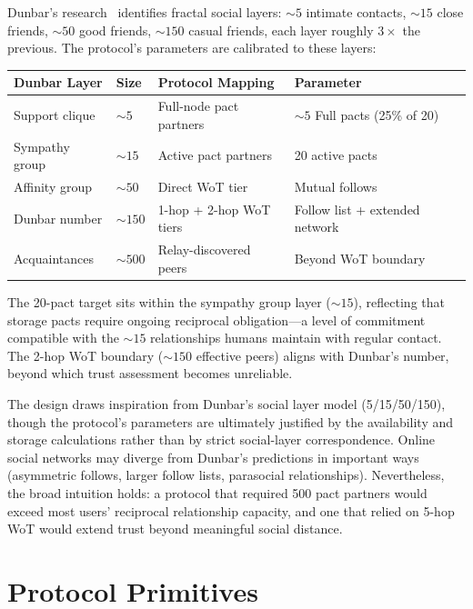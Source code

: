 \documentclass[11pt,a4paper]{article}
\begin{document}
Dunbar's research~\cite{dunbar} identifies fractal social layers: ${\sim}5$ intimate contacts, ${\sim}15$ close friends, ${\sim}50$ good friends, ${\sim}150$ casual friends, each layer roughly $3\times$ the previous. The protocol's parameters are calibrated to these layers:

\begin{table}[h]
\centering
\small
\begin{tabular}{lllll}
\toprule
\textbf{Dunbar Layer} & \textbf{Size} & \textbf{Protocol Mapping} & \textbf{Parameter} \\
\midrule
Support clique & ${\sim}5$ & Full-node pact partners & ${\sim}5$ Full pacts (25\% of 20) \\
Sympathy group & ${\sim}15$ & Active pact partners & 20 active pacts \\
Affinity group & ${\sim}50$ & Direct WoT tier & Mutual follows \\
Dunbar number & ${\sim}150$ & 1-hop + 2-hop WoT tiers & Follow list + extended network \\
Acquaintances & ${\sim}500$ & Relay-discovered peers & Beyond WoT boundary \\
\bottomrule
\end{tabular}
\end{table}

The 20-pact target sits within the sympathy group layer (${\sim}15$), reflecting that storage pacts require ongoing reciprocal obligation---a level of commitment compatible with the ${\sim}15$ relationships humans maintain with regular contact. The 2-hop WoT boundary (${\sim}150$ effective peers) aligns with Dunbar's number, beyond which trust assessment becomes unreliable.

The design draws inspiration from Dunbar's social layer model (5/15/50/150), though the protocol's parameters are ultimately justified by the availability and storage calculations rather than by strict social-layer correspondence. Online social networks may diverge from Dunbar's predictions in important ways (asymmetric follows, larger follow lists, parasocial relationships). Nevertheless, the broad intuition holds: a protocol that required 500 pact partners would exceed most users' reciprocal relationship capacity, and one that relied on 5-hop WoT would extend trust beyond meaningful social distance.

\section{Protocol Primitives}
\label{sec:primitives}
\end{document}
